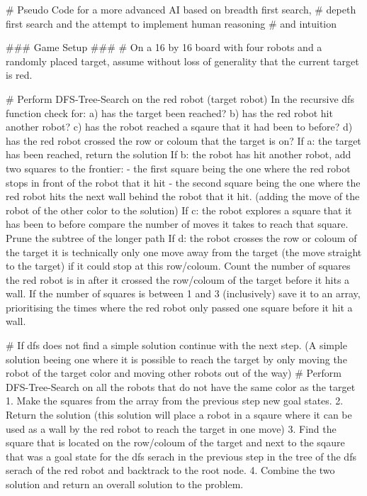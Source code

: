 # Pseudo Code for a more advanced AI based on breadth first search, 
# depeth first search and the attempt to implement human reasoning 
# and intuition

### Game Setup ###
# On a 16 by 16 board with four robots and a randomly placed target, assume without loss of generality that the current target is red.

# Perform DFS-Tree-Search on the red robot (target robot)
In the recursive dfs function check for:
 a) has the target been reached?
 b) has the red robot hit another robot?
 c) has the robot reached a sqaure that it had been to before?
 d) has the red robot crossed the row or coloum that the target is on?
If a: the target has been reached, return the solution 
If b: the robot has hit another robot, add two squares to the frontier:
		- the first square being the one where the red robot stops in front of the robot that it hit
		- the second square being the one where the red robot hits the next wall behind the robot that it hit.
		  (adding the move of the robot of the other color to the solution)
If c: the robot explores a square that it has been to before compare the number of moves it takes to reach that square. Prune the subtree of the longer path
If d: the robot crosses the row or coloum of the target it is technically only one move away from the target (the move straight to the target) if it could stop at this row/coloum.
	  Count the number of squares the red robot is in after it crossed the row/coloum of the target before it hits a wall.
	  If the number of squares is between 1 and 3 (inclusively) save it to an array, prioritising the times where the red robot only passed one square before it hit a wall.

# If dfs does not find a simple solution continue with the next step. (A simple solution beeing one where it is possible to reach the target by only moving the robot of the target color and moving other robots out of the way) 
# Perform DFS-Tree-Search on all the robots that do not have the same color as the target
1. Make the squares from the array from the previous step new goal states.
2. Return the solution (this solution will place a robot in a sqaure where it can be used as a wall by the red robot to reach the target in one move)
3. Find the square that is located on the row/coloum of the target and next to the sqaure that was a goal state for the dfs serach in the previous step in the tree of the dfs serach of the red robot and backtrack to the root node.
4. Combine the two solution and return an overall solution to the problem.
